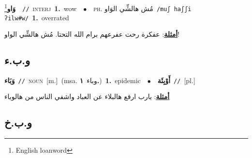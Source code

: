 \documentclass[10pt,a4paper,twoside]{article} %
\begin{document}
\begin{multicols}{2}
{\setlength\topsep{0pt}\textbf{\foreignlanguage{arabic}{وَاو}}\footnote{English loanword}\ \ {\color{gray}\texttt{//}\color{black}}\ \textsc{interj}\ \textbf{1.}~wow\ \ $\bullet$\ \ \textsc{ph.} \color{gray} \foreignlanguage{arabic}{مُش هالشِّي الوَاو}\color{black}\ {\color{gray}\texttt{/{\sffamily muʃ haʃʃi ʔilw\#w}/}\color{black}}\ \textbf{1.}~overrated\  \begin{flushright}\color{gray}\foreignlanguage{arabic}{\textbf{\underline{\foreignlanguage{arabic}{أمثلة}}}: عفكرة رحت عفرعهم برام الله التحتا. مُش هالشِّي الواو!}\end{flushright}\color{black}} \vspace{2mm}

\vspace{-3mm}
\subsection*{\color{blue}\foreignlanguage{arabic}{و.ب.ء}\color{blue}{}} 

{\setlength\topsep{0pt}\textbf{\foreignlanguage{arabic}{وَبَاء}}\ {\color{gray}\texttt{//}\color{black}}\ \textsc{noun}\ [m.]\ \color{gray}(msa. \foreignlanguage{arabic}{وباء}~\foreignlanguage{arabic}{\textbf{١.}})\color{black}\ \textbf{1.}~epidemic\ \ $\bullet$\ \ \setlength\topsep{0pt}\textbf{\foreignlanguage{arabic}{أَوْبِئَة}}\ {\color{gray}\texttt{//}\color{black}}\ [pl.]\  \begin{flushright}\color{gray}\foreignlanguage{arabic}{\textbf{\underline{\foreignlanguage{arabic}{أمثلة}}}: يارب ارفع هالبلاء عن العباد واشفي الناس من هالوباء}\end{flushright}\color{black}} \vspace{2mm}

\vspace{-3mm}
\subsection*{\color{blue}\foreignlanguage{arabic}{و.ب.خ}\color{blue}{}} 


\end{multicols}
\end{document}
